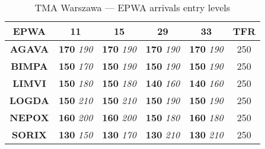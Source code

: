 
\begin{table}[htbp]
  \centering
  \begin{tabular}{|c|c|c|c|c|c|}
    \hline
    \rowcolor{white}
    \color{white}\cellcolor{vred}\textbf{EPWA}&\textbf{11}&\textbf{15}&\textbf{29}&\textbf{33}&\textbf{TFR}\\\hline
    \textbf{AGAVA} & \textbf{170} \textit{190} & \textbf{170} \textit{190} & \textbf{170} \textit{190} & \textbf{170} \textit{190} & 250\\\hline
    \textbf{BIMPA} & \textbf{150} \textit{170} & \textbf{150} \textit{190} & \textbf{150} \textit{190} & \textbf{150} \textit{190} & 250\\\hline
    \textbf{LIMVI} & \textbf{150} \textit{180} & \textbf{150} \textit{180} & \textbf{140} \textit{160} & \textbf{140} \textit{160} & 250\\\hline
    \textbf{LOGDA} & \textbf{150} \textit{210} & \textbf{150} \textit{210} & \textbf{150} \textit{190} & \textbf{150} \textit{190} & 250\\\hline
    \textbf{NEPOX} & \textbf{160} \textit{200} & \textbf{160} \textit{200} & \textbf{150} \textit{180} & \textbf{160} \textit{180} & 250\\\hline
    \textbf{SORIX} & \textbf{130} \textit{150} & \textbf{130} \textit{170} & \textbf{130} \textit{210} & \textbf{130} \textit{210} & 250\\\hline
  \end{tabular}
  \caption{TMA Warszawa --- EPWA arrivals entry levels}
  \label{tab:acc:coordination:warszawa:EPWA:entry}
\end{table}

